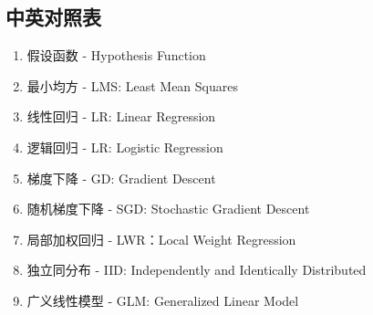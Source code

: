 \subsection{中英对照表}
\begin{enumerate}
	\item 假设函数 - Hypothesis Function
	\item 最小均方 - LMS: Least Mean Squares
	\item 线性回归 - LR: Linear Regression
	\item 逻辑回归 - LR: Logistic Regression
	\item 梯度下降 - GD: Gradient Descent
	\item 随机梯度下降 - SGD: Stochastic Gradient Descent
	\item 局部加权回归 - LWR：Local Weight Regression
	\item 独立同分布 - IID: Independently and Identically Distributed
	\item 广义线性模型 - GLM: Generalized Linear Model
\end{enumerate}